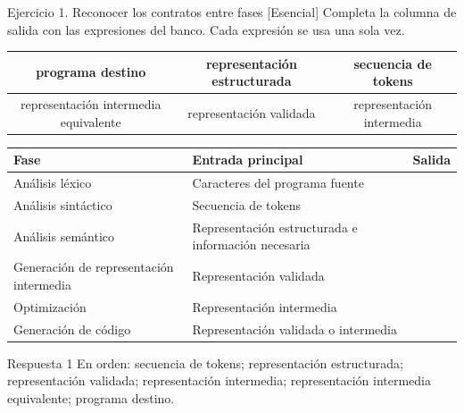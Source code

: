 \documentclass[11pt,spanish]{article}
\newcommand{\espaciosalida}{0.10cm}
\newcommand{\espaciosalida}{0.65cm}
\begin{document}
\begin{ejercicio}{Ejercicio 1. Reconocer los contratos entre fases \hfill {\small [Esencial]}}
Completa la columna de salida con las expresiones del banco. Cada expresión se usa una sola vez.

\begin{center}
\small
\begin{tabular}{|c|c|c|}
\hline
programa destino & representación estructurada & secuencia de tokens \tabularnewline
\hline
representación intermedia equivalente & representación validada & representación intermedia \tabularnewline
\hline
\end{tabular}
\end{center}

\begin{center}
\small
\renewcommand{\arraystretch}{1.35}
\begin{tabular}{|p{}|p{}|p{}|}
\hline
\textbf{Fase} & \textbf{Entrada principal} & \textbf{Salida} \tabularnewline
\hline
Análisis léxico & Caracteres del programa fuente & \tabularnewline[\espaciosalida]
\hline
Análisis sintáctico & Secuencia de tokens & \tabularnewline[\espaciosalida]
\hline
Análisis semántico & Representación estructurada e información necesaria & \tabularnewline[\espaciosalida]
\hline
Generación de representación intermedia & Representación validada & \tabularnewline[\espaciosalida]
\hline
Optimización & Representación intermedia & \tabularnewline[\espaciosalida]
\hline
Generación de código & Representación validada o intermedia & \tabularnewline[\espaciosalida]
\hline
\end{tabular}
\end{center}
\end{ejercicio}

\ifrespuestas
\begin{respuesta}{Respuesta 1}
En orden: secuencia de tokens; representación estructurada; representación validada; representación intermedia; representación intermedia equivalente; programa destino.
\end{respuesta}
\fi
\end{document}
